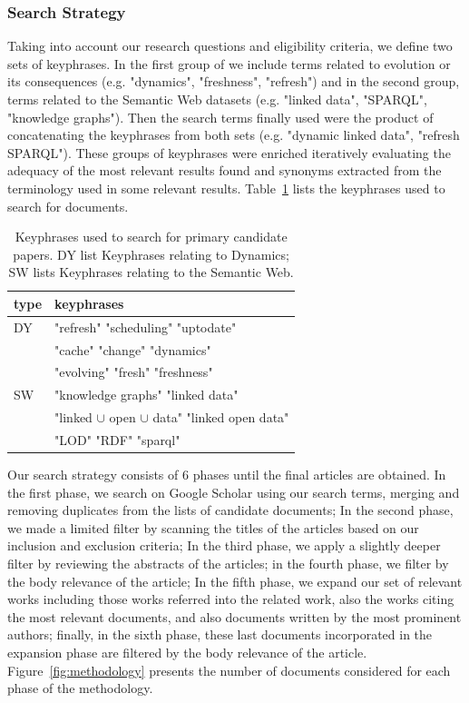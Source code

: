 \documentclass[sw]{iosart2x}
\begin{document}
\subsubsection{Search Strategy}\label{Search}

Taking into account our research questions and eligibility criteria, we define two sets of keyphrases. In the first group of we include terms related to evolution or its consequences (e.g. "dynamics", "freshness", "refresh") and in the second group, terms related to the Semantic Web datasets (e.g. "linked data", "SPARQL", "knowledge graphs"). Then the search terms finally used were the product of concatenating the keyphrases from both sets (e.g. "dynamic linked data", "refresh SPARQL"). These groups of keyphrases were enriched iteratively evaluating the adequacy of the most relevant results found and synonyms extracted from the terminology used in some relevant results. Table~\ref{tab:terms} lists the keyphrases used to search for documents.


\begin{table}[]
	\centering
	\caption{Keyphrases used to search for primary candidate papers. DY list Keyphrases relating to Dynamics; SW lists Keyphrases relating to the Semantic Web.}
	\label{tab:terms}
	\begin{tabular}{ll} 
		\hline
		type & keyphrases  \\ \hline
		DY    & "refresh"
		"scheduling"
		"uptodate" \\ &
		"cache"
		"change"
		"dynamics" \\ &
		"evolving"
		"fresh"
		"freshness"            \\ \hline
		SW    & "knowledge graphs"
		"linked data" \\ &
		"linked $\cup$ open $\cup$ data"
		"linked open data" \\ &
		"LOD"
		"RDF"
		"sparql"           \\ \hline
	\end{tabular}
\end{table}


Our search strategy consists of 6 phases until the final articles are obtained. In the first phase, we search on Google Scholar using our search terms, merging and removing duplicates from the lists of candidate documents; In the second phase, we made a limited filter by scanning the titles of the articles based on our inclusion and exclusion criteria; In the third phase, we apply a slightly deeper filter by reviewing the abstracts of the articles; in the fourth phase, we filter by the body relevance of the article; In the fifth phase, we expand our set of relevant works including those works referred into the related work, also the works citing the most relevant documents, and also documents written by the most prominent authors; finally, in the sixth phase, these last documents incorporated in the expansion phase are filtered by the body relevance of the article. Figure~\ref{fig:methodology} presents the number of documents considered for each phase of the methodology.
\end{document}
